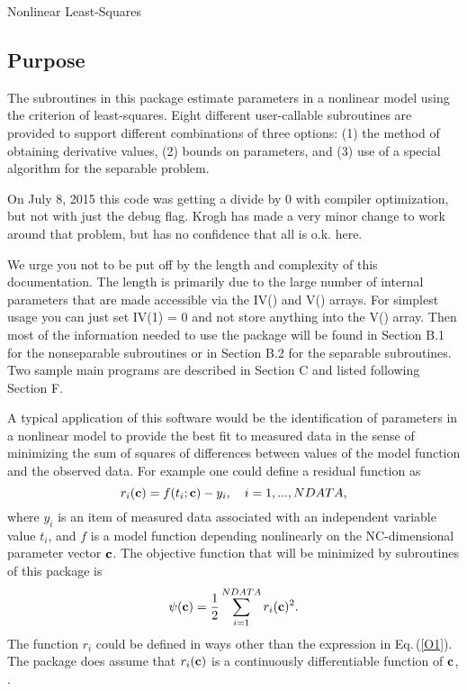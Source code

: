 \documentclass[twoside]{MATH77}
\begin{document}
 Nonlinear Least-Squares


\subsection{Purpose}

The subroutines in this package estimate parameters in a nonlinear model
using the criterion of least-squares. Eight different user-callable
subroutines are provided to support different combinations of three options:
(1) the method of obtaining derivative values, (2) bounds on parameters, and
(3) use of a special algorithm for the separable problem.

On July 8, 2015 this code was getting a divide by 0 with compiler optimization,
but not with just the debug flag.  Krogh has made a very minor change to work
around that problem, but has no confidence that all is o.k. here.

We urge you not to be put off by the length and complexity of this
documentation.  The length is primarily due to the large number of
internal parameters that are made accessible via the IV() and V() arrays.
For simplest usage you can just set IV(1) = 0 and not store anything into
the V() array.  Then most of the information needed to use the package
will be found in Section B.1 for the nonseparable subroutines or in
Section B.2 for the separable subroutines.  Two sample main programs are
described in Section C and listed following Section F.

A typical application of this software would be the identification of
parameters in a nonlinear model to provide the best fit to measured data in
the sense of minimizing the sum of squares of differences between values of
the model function and the observed data. For example one could define a
residual function as
\begin{equation}
\label{O1}r_i({\bf c})=f(t_i;{\bf c})-y_i,\quad i=1,...,NDATA,
\end{equation}
where $y_i$ is an item of measured data associated with an independent
variable value $t_i$, and $f$ is a model function depending nonlinearly on
the NC-dimensional parameter vector ${\bf c}$. The objective function that
will be minimized by subroutines of this package is
\begin{equation}
\label{O2}\psi ({\bf c})=\frac 12\sum_{i=1}^{NDATA}r_i({\bf c})^2.
\end{equation}
The function $r_i$ could be defined in ways other than the expression in
Eq.\,(\ref{O1}). The package does assume that $r_i({\bf c})$ is a continuously
differentiable function of ${\bf c}$, \cite[p.~369]{Dennis:1981:ANL}.
\end{document}
